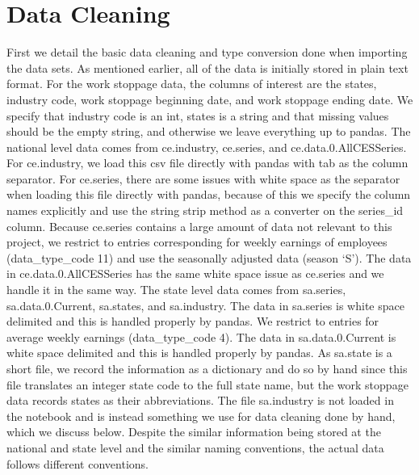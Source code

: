 \documentclass[reqno,11pt]{amsart}
\begin{document}
\section{Data Cleaning}

First we detail the basic data cleaning and type conversion done when importing the
data sets. As mentioned earlier, all of the data is initially stored in plain text format.
For the work stoppage data, the columns of interest are the states, industry code,
work stoppage beginning date, and work stoppage ending date. We specify that industry code
is an int, states is a string and that missing values should be the empty string,
and otherwise we leave everything up to pandas. The national level data comes 
from ce.industry, ce.series, and ce.data.0.AllCESSeries.
For ce.industry, we load this csv file directly with pandas with tab as the column separator.
For ce.series, there are some issues with white space as the separator
when loading this file directly with pandas, because of this we specify the column names 
explicitly and use the string strip method as a converter on the series\_id column.
Because ce.series contains a large amount of data not relevant to this project, we
restrict to entries corresponding for weekly earnings of employees (data\_type\_code 11)
and use the seasonally adjusted data (season `S'). The data in 
ce.data.0.AllCESSeries has the same white space issue as ce.series and we handle it in the same way.
The state level data comes from sa.series, sa.data.0.Current, sa.states, and sa.industry.
The data in sa.series is white space delimited and this is handled properly by pandas.
We restrict to entries for average weekly earnings (data\_type\_code 4).
The data in sa.data.0.Current is white space delimited and this is handled properly by pandas.
As sa.state is a short file, we record the information as a dictionary and do so by hand
since this file translates an integer state code to the full state name, but the work
stoppage data records states as their abbreviations. The file sa.industry is not loaded
in the notebook and is instead something we use for data cleaning done by hand, which
we discuss below. Despite the similar information being stored at the national and 
state level and the similar naming conventions, the actual data follows different conventions. 
\end{document}
